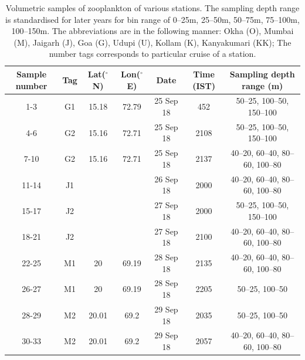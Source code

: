 \documentclass[authoryear,review,12pt]{elsarticle}
\begin{document}
\begin{table}[htbp]
	
	{\scriptsize
		\captionsetup{justification=justified,font=footnotesize,skip=0.05\baselineskip,width=\textwidth} %
		\caption{\newline Volumetric samples of zooplankton of various stations. The sampling depth range is standardised for later years for bin range of 0--25m, 25--50m, 50--75m, 75--100m, 100--150m. The abbreviations are in the following manner: Okha (O), Mumbai (M), Jaigarh (J), Goa (G), Udupi (U), Kollam (K), Kanyakumari (KK); The number tags corresponds to particular cruise of a station.}
		\begin{adjustwidth}{0in}{-2in} 
			\begin{tabular}{ccccccc}
				\toprule
				Sample number & Tag & Lat($^{\circ}$N)    & Lon($^{\circ}$E)   & Date & Time (IST) & Sampling depth range (m)      \\
				\midrule
				1-3         & G1  & 15.18      & 72.79      & 25 Sep 18                 & 452        & 50–25, 100–50, 150–100        \\
				4-6         & G2  & 15.16      & 72.71      & 25 Sep 18                 & 2108       & 50–25, 100–50, 150–100        \\
				7-10        & G2  & 15.16      & 72.71      & 25 Sep 18                 & 2137       & 40–20, 60–40, 80–60, 100–80   \\
				11-14       & J1  &            &            & 26 Sep 18                 & 2000       & 40–20, 60–40, 80–60, 100–80   \\
				15-17       & J2  &            &            & 27 Sep 18                 & 2000       & 50–25, 100–50, 150–100        \\
				18-21       & J2  &            &            & 27 Sep 18                 & 2100       & 40–20, 60–40, 80–60, 100–80   \\
				22-25       & M1  & 20         & 69.19      & 28 Sep 18                 & 2135       & 40–20, 60–40, 80–60, 100–80   \\
				26-27       & M1  & 20         & 69.19      & 28 Sep 18                 & 2205       & 50–25, 100–50                 \\
				28-29       & M2  & 20.01      & 69.2       & 29 Sep 18                 & 2035       & 50–25, 100–50                 \\
				30-33       & M2  & 20.01      & 69.2       & 29 Sep 18                 & 2057       & 40–20, 60–40, 80–60, 100–80   \\

\end{tabular}
\end{adjustwidth}}
\end{table}
\end{document}
